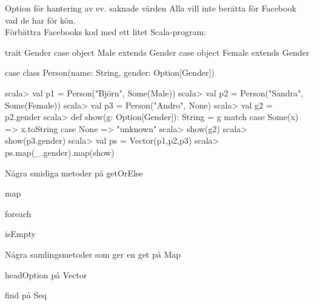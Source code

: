 \begin{Slide}{Option för hantering av ev. saknade värden}\SlideFontSmall
Alla vill inte berätta för Facebook vad de har för kön. \\ Förbättra Facebooks kod med ett litet Scala-program:
\begin{Code}
trait Gender
case object Male   extends Gender
case object Female extends Gender

case class Person(name: String, gender: Option[Gender])
\end{Code}
\pause
\begin{REPL}
scala> val p1 = Person("Björn",  Some(Male))
scala> val p2 = Person("Sandra", Some(Female))
scala> val p3 = Person("Andro",  None)
scala> val g2 = p2.gender
scala> def show(g: Option[Gender]): String = g match {
         case Some(x) => x.toString
         case None    => "unknown"
       }
scala> show(g2)
scala> show(p3.gender)
scala> val ps = Vector(p1,p2,p3)
scala> ps.map(_.gender).map(show)
\end{REPL}
\end{Slide}

\begin{Slide}{Några smidiga metoder på }
getOrElse

map

foreach

isEmpty
\end{Slide}


\begin{Slide}{Några samlingsmetoder som ger en }
get på Map

headOption på Vector

find på Seq
\end{Slide}



\fi


